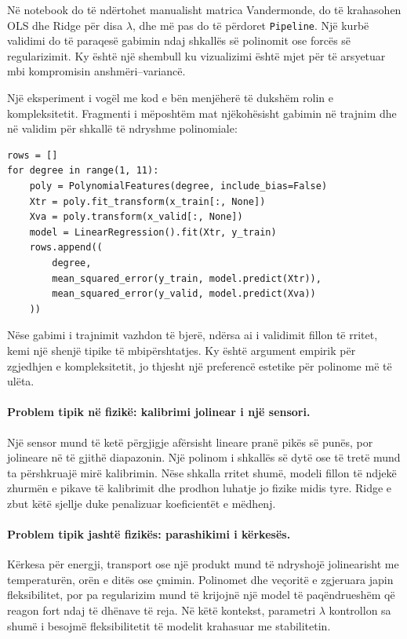 \documentclass[12pt,a4paper,oneside]{book}
\begin{document}
Në notebook do të ndërtohet manualisht matrica Vandermonde, do të krahasohen OLS dhe Ridge për disa $\lambda$, dhe më pas do të përdoret \texttt{Pipeline}. Një kurbë validimi do të paraqesë gabimin ndaj shkallës së polinomit ose forcës së regularizimit. Ky është një shembull ku vizualizimi është mjet për të arsyetuar mbi kompromisin anshmëri--variancë.

Një eksperiment i vogël me kod e bën menjëherë të dukshëm rolin e kompleksitetit. Fragmenti i mëposhtëm mat njëkohësisht gabimin në trajnim dhe në validim për shkallë të ndryshme polinomiale:
\begin{lstlisting}[caption={Kompleksiteti polinomial dhe gabimi i validimit.}]
rows = []
for degree in range(1, 11):
    poly = PolynomialFeatures(degree, include_bias=False)
    Xtr = poly.fit_transform(x_train[:, None])
    Xva = poly.transform(x_valid[:, None])
    model = LinearRegression().fit(Xtr, y_train)
    rows.append((
        degree,
        mean_squared_error(y_train, model.predict(Xtr)),
        mean_squared_error(y_valid, model.predict(Xva))
    ))
\end{lstlisting}
Nëse gabimi i trajnimit vazhdon të bjerë, ndërsa ai i validimit fillon të rritet, kemi një shenjë tipike të mbipërshtatjes. Ky është argument empirik për zgjedhjen e kompleksitetit, jo thjesht një preferencë estetike për polinome më të ulëta.


\paragraph{Problem tipik në fizikë: kalibrimi jolinear i një sensori.}
Një sensor mund të ketë përgjigje afërsisht lineare pranë pikës së punës, por jolineare në të gjithë diapazonin. Një polinom i shkallës së dytë ose të tretë mund ta përshkruajë mirë kalibrimin. Nëse shkalla rritet shumë, modeli fillon të ndjekë zhurmën e pikave të kalibrimit dhe prodhon luhatje jo fizike midis tyre. Ridge e zbut këtë sjellje duke penalizuar koeficientët e mëdhenj.

\paragraph{Problem tipik jashtë fizikës: parashikimi i kërkesës.}
Kërkesa për energji, transport ose një produkt mund të ndryshojë jolinearisht me temperaturën, orën e ditës ose çmimin. Polinomet dhe veçoritë e zgjeruara japin fleksibilitet, por pa regularizim mund të krijojnë një model të paqëndrueshëm që reagon fort ndaj të dhënave të reja. Në këtë kontekst, parametri $\lambda$ kontrollon sa shumë i besojmë fleksibilitetit të modelit krahasuar me stabilitetin.
\end{document}
